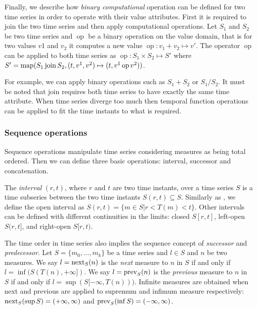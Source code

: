 Finally, we describe how \emph{binary computational} operation can be defined
for two time series in order to operate with their value attributes.
First it is required to join the two time series and then apply
computational operations. Let $S_1$ and $S_2$ be two time series and
$\operatorname{op}$ be a binary operation on the value domain, that is
for two values $v1$ and $v_2$ it computes a new value
$\operatorname{op}: v_1 + v_2 \mapsto v'$. The operator
$\operatorname{op}$ can be applied to both time series as
$\operatorname{op}: S_1 \times S_2 \mapsto S'$ where $S' =
\operatorname*{map}(S_1 \operatorname*{join} S_2, (t,v^1,v^2)\mapsto(t,v^1 \operatorname{op} v^2))$.

For example, we can apply binary operations such as $S_1 + S_2$ or
$S_1 / S_2$. It must be noted that join requires both time series to
have exactly the same time attribute. When time series diverge too
much then temporal function operations can be applied to fit the time
instants to what is required.





\subsubsection{Sequence operations}

Sequence operations manipulate time series considering measures as
being total ordered. Then we can define three basic operations:
interval, successor and concatenation.


The \emph{interval} $(r,t)$, where $r$ and $t$ are two time instants, over a
time series $S$ is a time subseries between the two time instants
$S(r,t) \subseteq S$. Similarly as \cite{last:hetland}, we define the
open interval as $S(r,t)=\{m\in S | r<T(m)<t\}$. Other intervals can
be defined with different continuities in the limits: closed $S[r,t]$,
left-open $S(r,t]$, and right-open $S[r,t)$.

The time order in time series also implies the sequence concept of
\emph{successor} and \emph{predecessor}.  Let $S=\{m_0, \ldots, m_k\}$
be a time series and $l\in S$ and $n$ be two measures. We say
$l=\operatorname*{next}_S(n)$ is the \emph{next} measure to $n$ in $S$ if and only if
$l=\inf(S(T(n),+\infty])$.  We say $l=\operatorname*{prev}_S(n)$ is the
\emph{previous} measure to $n$ in $S$ if and only if
$l=\sup(S[-\infty,T(n)))$. %
Infinite measures are obtained when next and previous are applied to
supremum and infimum measure respectively: $\operatorname*{next}_S(\sup
S)=(+\infty,\infty)$ and $\operatorname*{prev}_S(\inf S)=(-\infty,\infty)$.



